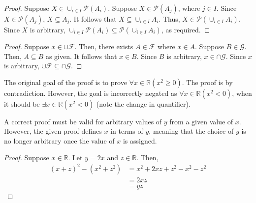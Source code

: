 \documentclass[12pt,letterpaper]{exam}
\begin{document}
\begin{questions}
    \setcounter{question}{13}
    \question
    \begin{proof}
        Suppose $X \in \cup_{i \in I} \mathscr{P}(A_i)$.
        Suppose $X \in \mathscr{P}(A_j)$, where $j \in I$. 
        Since $X \in \mathscr{P}(A_j)$, $X \subseteq A_j$.
        It follows that $X \subseteq \cup_{i \in I} A_i$.
        Thus, $X \in \mathscr P(\cup_{i \in I} A_i)$.
        Since $X$ is arbitrary,  $\cup_{i \in I} \mathscr{P}(A_i) \subseteq \mathscr P(\cup_{i \in I} A_i)$, as required.
    \end{proof}

    \setcounter{question}{16}
    \question
    \begin{proof}
        Suppose $x \in \cup \mathcal F$.
            Then, there exists $A \in \mathcal F$ where $x \in A$.
            Suppose $B \in \mathcal G$.
                Then, $A \subseteq B$ as given.
                It follows that $x \in B$.
            Since $B$ is arbitrary, $x \in \cap \mathcal G$.
        Since $x$ is arbitrary, $\cup \mathcal F \subseteq \cap \mathcal G$.
    \end{proof}

    \setcounter{question}{19}
    \question
    The original goal of the proof is to prove $\forall x \in \mathbb R (x^2 \geq 0)$.
    The proof is by contradiction.
    However, the goal is incorrectly negated as $\forall x \in \mathbb R (x^2 < 0)$,
    when it should be $\exists x \in \mathbb R (x^2 < 0)$ (note the change in quantifier).

    \setcounter{question}{21}
    \question
    A correct proof must be valid for arbitrary values of $y$ from a given value of $x$.
    However, the given proof defines $x$ in terms of $y$, meaning that the choice of $y$ is no
    longer arbitrary once the value of $x$ is assigned.

    \setcounter{question}{24}
    \question
    \begin{proof}
        Suppose $x \in \mathbb R$.
            Let $y = 2x$ and $z \in \mathbb R$. Then,
            \begin{align*}
                (x+z)^2 - (x^2+z^2) &= x^2 + 2xz + z^2 - x^2 - z^2 \\
                &= 2xz \\
                &= yz
            \end{align*}
    \end{proof}

\end{questions}
\end{document}
